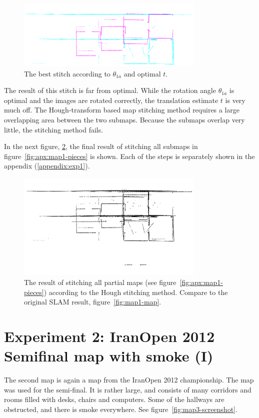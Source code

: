 \begin{figure}[ht]
  \centering
  \includegraphics[width=0.8\textwidth]{images/experiment/map1/stitch1-1a-result.png}
  \caption{The best stitch according to $\theta_{1a}$ and optimal $t$.}
  \label{fig:exp:1:result1}
\end{figure}

The result of this stitch is far from optimal. While the rotation angle $\theta_{1a}$ is optimal and the images are rotated correctly, the translation estimate $t$ is very much off. The Hough-transform based map stitching method requires a large overlapping area between the two submaps. Because the submaps overlap very little, the stitching method fails.

In the next figure, \ref{fig:exp:1:result8}, the final result of stitching all submaps in figure~\ref{fig:apx:map1-pieces} is shown. Each of the steps is separately shown in the appendix (\ref{appendix:exp1}).

\begin{figure}[ht]
  \centering
  \includegraphics[width=0.8\textwidth]{images/experiment/map1/result/step8.png}
  \caption{The result of stitching all partial maps (see figure~\ref{fig:apx:map1-pieces}) according to the Hough stitching method. Compare to the original SLAM result, figure~\ref{fig:map1-map}.}
  \label{fig:exp:1:result8}
\end{figure}

\section{Experiment 2: IranOpen 2012 Semifinal map with smoke (I)}
The second map is again a map from the IranOpen 2012 championship. The map was used for the semi-final. It is rather large, and consists of many corridors and rooms filled with desks, chairs and computers. Some of the hallways are obstructed, and there is smoke everywhere. See figure~\ref{fig:map3-screenshot}.

